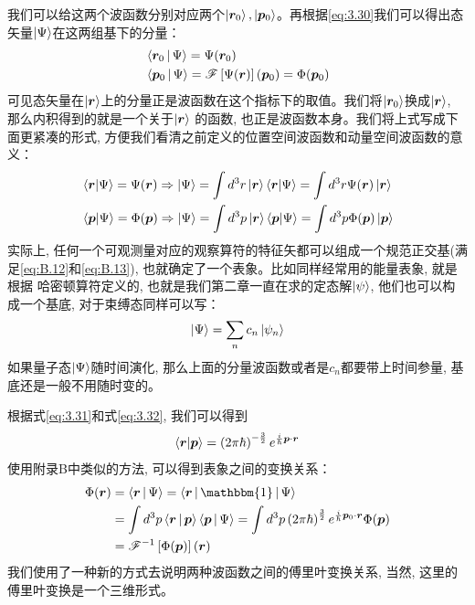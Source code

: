 \documentclass[a4paper,zihao=-4,linespread=1]{ctexrep}
\begin{document}
    我们可以给这两个波函数分别对应两个$\ket{\bm{r}_0},\ket{\bm{p}_0}$。再根据\ref{eq:3.30}我们可以得出态矢量$\Ket{\Psi}$在这两组基下的分量：
    \begin{align}
        &\Braket{\bm{r}_0|\Psi}=\Psi(\bm{r}_0)\\
        &\Braket{\bm{p}_0|\Psi}=\mathscr{F}\left[\Psi(\bm{r})\right](\bm{p}_0)=\Phi(\bm{p}_0)
    \end{align}
    可见态矢量在$\ket{\bm{r}}$上的分量正是波函数在这个指标下的取值。我们将$\ket{\bm{r}_0}$换成$\ket{\bm{r}}$, 那么内积得到的就是一个关于$\ket{\bm{r}}$
    的函数, 也正是波函数本身。我们将上式写成下面更紧凑的形式, 方便我们看清之前定义的位置空间波函数和动量空间波函数的意义：
    \begin{align}
        &\braket{\bm{r}|\Psi}=\Psi(\bm{r})\Rightarrow \ket{\Psi}=\int d^3r \ket{\bm{r}}\braket{\bm{r}|\Psi}=\int d^3r \Psi(\bm{r})\ket{\bm{r}}\\
        &\braket{\bm{p}|\Psi}=\Phi(\bm{p})\Rightarrow \ket{\Psi}=\int d^3p \ket{\bm{r}}\braket{\bm{p}|\Psi}=\int d^3p \Phi(\bm{p})\ket{\bm{p}}
    \end{align}
    实际上, 任何一个可观测量对应的观察算符的特征矢都可以组成一个规范正交基(满足\ref{eq:B.12}和\ref{eq:B.13}), 也就确定了一个表象。比如同样经常用的能量表象, 就是根据
    哈密顿算符定义的, 也就是我们第二章一直在求的定态解$\ket{\psi}$, 他们也可以构成一个基底, 对于束缚态同样可以写：
    \[\ket{\Psi}=\sum\limits_n c_n\ket{\psi_n}\]  
    如果量子态$\ket{\Psi}$随时间演化, 那么上面的分量波函数或者是$c_n$都要带上时间参量, 基底还是一般不用随时变的。
    
    根据式\ref{eq:3.31}和式\ref{eq:3.32}, 我们可以得到\[\braket{\bm{r}|\bm{p}}=\left(2\pi\hbar\right)^{-\frac{3}{2}}e^{\frac{i}{\hbar}\bm{p}\cdot\bm{r}}\]
    使用附录B中类似的方法, 可以得到表象之间的变换关系：
    \begin{align*}
        \Phi(\bm{r})&=\Braket{\bm{r}|\Psi}=\Braket{\bm{r}|\mathbbm{1}|\Psi}\\
        &=\int d^3p\Braket{\bm{r}|\bm{p}}\Braket{\bm{p}|\Psi}=\int d^3p\left(2\pi\hbar\right)^{\frac{3}{2}}e^{\frac{i}{\hbar}\bm{p}_0\cdot\bm{r}}\Phi(\bm{p})\\
        &=\mathscr{F}^{-1}\left[\Phi(\bm{p})\right](\bm{r})
    \end{align*}
    我们使用了一种新的方式去说明两种波函数之间的傅里叶变换关系, 当然, 这里的傅里叶变换是一个三维形式。
\end{document}
